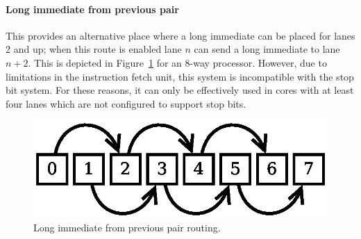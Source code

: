 \paragraph*{Long immediate from previous pair}

This provides an alternative place where a long immediate can be placed for 
lanes 2 and up; when this route is enabled lane $n$ can send a long immediate to 
lane $n+2$. This is depicted in 
Figure~\ref{fig:core-ug-isa-syl-classes-limm-previous} for an 8-way \rvex{} 
processor. However, due to limitations in the instruction fetch unit, this 
system is incompatible with the stop bit system. For these reasons, it can only 
be effectively used in cores with at least four lanes which are not configured 
to support stop bits.

\begin{figure}[h!]
  \centering
  \includegraphics[scale=0.6]{assets/long-immediate-fwding/previous}
  \caption{Long immediate from previous pair routing.}
  \label{fig:core-ug-isa-syl-classes-limm-previous}
\end{figure}

